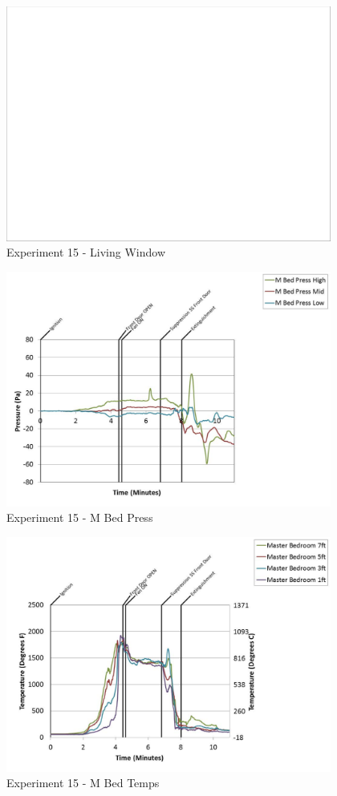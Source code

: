 \documentclass{article}
\begin{document}
\begin{appendices}
	\begin{figure}[h!]
		\centering
		\includegraphics[height=3.05in]{0_Images/Results_Charts/Exp_15_Charts/LivingWindow.pdf}
		\caption{Experiment 15 - Living Window}
	\end{figure}
 
	\clearpage

	\begin{figure}[h!]
		\centering
		\includegraphics[height=3.05in]{0_Images/Results_Charts/Exp_15_Charts/MBedPress.pdf}
		\caption{Experiment 15 - M Bed Press}
	\end{figure}
 

	\begin{figure}[h!]
		\centering
		\includegraphics[height=3.05in]{0_Images/Results_Charts/Exp_15_Charts/MBedTemps.pdf}
		\caption{Experiment 15 - M Bed Temps}
	\end{figure}
 

\end{appendices}
\end{document}
